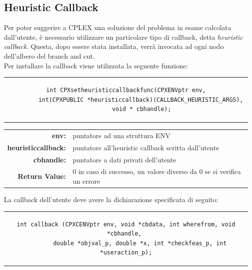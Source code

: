 \subsection{Heuristic Callback}
Per poter suggerire a CPLEX una soluzione del problema in esame calcolata dall'utente, è necessario utilizzare un particolare tipo di callback, detta \textit{heuristic callback}. Questa, dopo essere stata installata, verrà invocata ad ogni nodo dell'albero del branch and cut.\\
Per installare la callback viene utilizzata la seguente funzione:
\begin{center}
\begin{tabular}{c}
\begin{lstlisting}[linewidth=330pt, basicstyle=\footnotesize\sffamily,]    
int CPXsetheuristiccallbackfunc(CPXENVptr env,
		 int(CPXPUBLIC *heuristiccallback)(CALLBACK_HEURISTIC_ARGS), 
		 void * cbhandle);
\end{lstlisting}
\end{tabular}
\end{center}
\begin{table}[h]
\centering
\begin{tabular}{rl}
\textbf{env:} & {puntatore ad una struttura ENV}\\
\textbf{heuristiccallback:} & {puntatore all'heuristic callback scritta dall'utente}\\
\textbf{cbhandle:} & {puntatore a dati privati dell'utente}\\
\textbf{Return Value:} & {0 in caso di successo, un valore diverso da 0 se si verifica un errore}\\
\end{tabular}
\end{table}
La callback dell'utente deve avere la dichiarazione specificata di seguito:
\begin{center}
\begin{tabular}{c}
\begin{lstlisting}[linewidth=382pt, basicstyle=\footnotesize\sffamily,] 
 int callback (CPXCENVptr env, void *cbdata, int wherefrom, void *cbhandle, 
 		double *objval_p, double *x, int *checkfeas_p, int *useraction_p);
\end{lstlisting}
\end{tabular}
\end{center}
